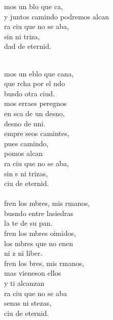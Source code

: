 \begin{cancion}%
	\begin{chorus}%
	mos un blo que ca,\\
	y juntos camindo podremos alcan\\
	ra ciu que no se aba,\\
	sin  ni triza,\\
	dad de eternid.\\
	\end{chorus}%
	\jump\\
	mos un eblo que cana,\\
	que rcha por el ndo\\
	busdo otra ciud.\\
	mos erraes peregnos\\
	en sca de un desno,\\
	desno de uni.\\
	empre seos camintes,\\
	pues  camindo,\\
	pomos alcan\\
	ra ciu que no se aba,\\
	sin s ni trizas,\\
	ciu de eternid.\\
	\jump\\
	fren los mbres, mis rmanos,\\
	busndo entre lasiedras\\
	la te de su pan.\\
	fren los mbres oimidos,\\
	los mbres que no enen\\
	ni z ni liber.\\
	fren los bres, mis rmanos,\\
	mas vieneson ellos\\
	y ti alcanzan\\
	ra ciu que no se aba\\
	senas ni stezas,\\
	ciu de eternid.\\
\end{cancion}%
